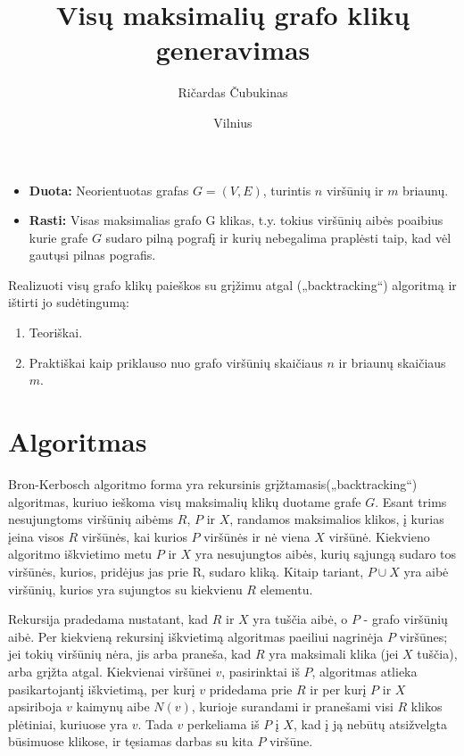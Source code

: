 \documentclass{VUMIFInfKursinis}
\institute{Informatikos institutas}
\title{Visų maksimalių grafo klikų generavimas}
\author{Ričardas Čubukinas}
\date{Vilnius \\ \the\year}
\begin{document}
\maketitle

\tableofcontents

\begin{itemize}
  \item{\textbf{Duota:} Neorientuotas grafas $G=(V,E)$, turintis $n$ viršūnių ir $m$ briaunų.}
  \item{\textbf{Rasti:} Visas maksimalias grafo G klikas, t.y. tokius viršūnių aibės poaibius kurie grafe $G$ sudaro pilną pografį ir kurių nebegalima praplėsti taip, kad vėl gautųsi pilnas pografis.}
\end{itemize}

Realizuoti visų grafo klikų paieškos su grįžimu atgal („backtracking“) algoritmą ir ištirti jo
sudėtingumą:
\begin{enumerate}
  \item{Teoriškai.}
  \item{Praktiškai kaip priklauso nuo grafo viršūnių skaičiaus $n$ ir briaunų skaičiaus $m$.}
\end{enumerate}

\section{Algoritmas}
Bron-Kerbosch algoritmo forma yra rekursinis grįžtamasis(„backtracking“) algoritmas, kuriuo ieškoma visų maksimalių klikų duotame grafe $G$. Esant trims nesujungtoms viršūnių aibėms $R$, $P$ ir $X$, randamos maksimalios klikos, į kurias įeina visos $R$ viršūnės, kai kurios $P$ viršūnės ir nė viena $X$ viršūnė. Kiekvieno algoritmo iškvietimo metu $P$ ir $X$ yra nesujungtos aibės, kurių sąjungą sudaro tos viršūnės, kurios, pridėjus jas prie R, sudaro kliką. Kitaip tariant, $P \cup X$ yra aibė viršūnių, kurios yra sujungtos su kiekvienu $R$ elementu.

Rekursija pradedama nustatant, kad $R$ ir $X$ yra tuščia aibė, o $P$ - grafo viršūnių aibė. Per kiekvieną rekursinį iškvietimą algoritmas paeiliui nagrinėja $P$ viršūnes; jei tokių viršūnių nėra, jis arba praneša, kad $R$ yra maksimali klika (jei $X$ tuščia), arba grįžta atgal. Kiekvienai viršūnei $v$, pasirinktai iš $P$, algoritmas atlieka pasikartojantį iškvietimą, per kurį $v$ pridedama prie $R$ ir per kurį $P$ ir $X$ apsiriboja $v$ kaimynų aibe $N(v)$, kurioje surandami ir pranešami visi $R$ klikos plėtiniai, kuriuose yra $v$. Tada $v$ perkeliama iš $P$ į $X$, kad į ją nebūtų atsižvelgta būsimuose klikose, ir tęsiamas darbas su kita $P$ viršūne. 
\end{document}
